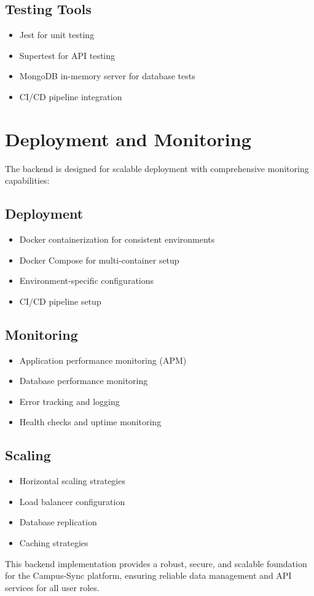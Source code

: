 \subsection{Testing Tools}

\begin{itemize}
    \item Jest for unit testing
    \item Supertest for API testing
    \item MongoDB in-memory server for database tests
    \item CI/CD pipeline integration
\end{itemize}

\section{Deployment and Monitoring}

The backend is designed for scalable deployment with comprehensive monitoring capabilities:

\subsection{Deployment}

\begin{itemize}
    \item Docker containerization for consistent environments
    \item Docker Compose for multi-container setup
    \item Environment-specific configurations
    \item CI/CD pipeline setup
\end{itemize}

\subsection{Monitoring}

\begin{itemize}
    \item Application performance monitoring (APM)
    \item Database performance monitoring
    \item Error tracking and logging
    \item Health checks and uptime monitoring
\end{itemize}

\subsection{Scaling}

\begin{itemize}
    \item Horizontal scaling strategies
    \item Load balancer configuration
    \item Database replication
    \item Caching strategies
\end{itemize}

This backend implementation provides a robust, secure, and scalable foundation for the Campus-Sync platform, ensuring reliable data management and API services for all user roles.